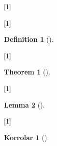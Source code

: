
\usepackage{environ}
\usepackage[utf8]{inputenc}
\usepackage[fleqn]{amsmath}
\usepackage{amsthm}
\usepackage{amssymb}
\usepackage{nameref}
\usepackage{enumitem}
\usepackage{babel}

\let\oldparagraph\paragraph
\renewcommand{\paragraph}[1]{\oldparagraph{#1}\mbox{}\\}

\setlength\parindent{0pt}

[1]{
	
}



\newtheorem{definition}{Definition}[section]
\newtheorem{theorem}{Theorem}[section]
\newtheorem{corollary}{Korrolar}[theorem]
\newtheorem{lemma}[theorem]{Lemma}
\newtheorem*{remark}{Anmerkung}

\renewcommand*{\proofname}{Beweis}

[1]{
	\begin{definition}[#1]
		\label{#1}
		\BODY
	\end{definition}
}

[1]{
	\begin{theorem}[#1]
		\label{#1}
		\BODY
	\end{theorem}
}

[1]{
	\begin{lemma}[#1]
		\label{#1}
		\BODY
	\end{lemma}
}

[1]{
	\begin{corollary}[#1]
		\label{#1}
		\BODY
	\end{corollary}
}

